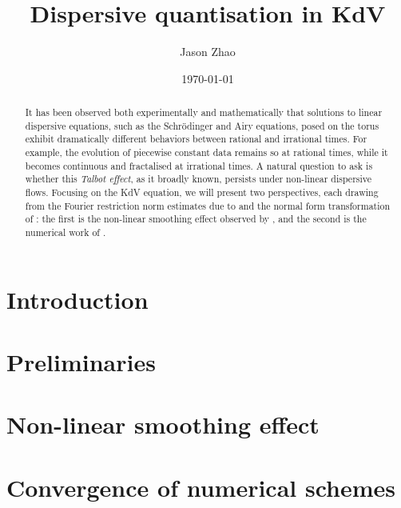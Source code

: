 \documentclass[reqno]{amsart}
\title
{
	Dispersive quantisation in KdV
}
\author{Jason Zhao}
\date{\today}
\begin{document}
\begin{abstract}
	It has been observed both experimentally and mathematically that solutions to linear dispersive equations, such as the Schr\"odinger and Airy equations, posed on the torus exhibit dramatically different behaviors between rational and irrational times. For example, the evolution of piecewise constant data remains so at rational times, while it becomes continuous and fractalised at irrational times. A natural question to ask is whether this \textit{Talbot effect}, as it broadly known, persists under non-linear dispersive flows. Focusing on the KdV equation, we will present two perspectives, each drawing from the Fourier restriction norm estimates due to
	\cite{Bourgain1993} and the normal form transformation of \cite{BabinEtAl2011}: the first is the non-linear smoothing effect observed by \cite{ErdoganTzirakis2013}, and the second is the numerical work of \cite{HofmanovaSchratz2017,RoussetSchratz2022}. 
\end{abstract}
\maketitle

\tableofcontents

\section{Introduction}


\section{Preliminaries}


\section{Non-linear smoothing effect}\label{sec:smooth}


\section{Convergence of numerical schemes}\label{sec:numerics}




\end{document}
